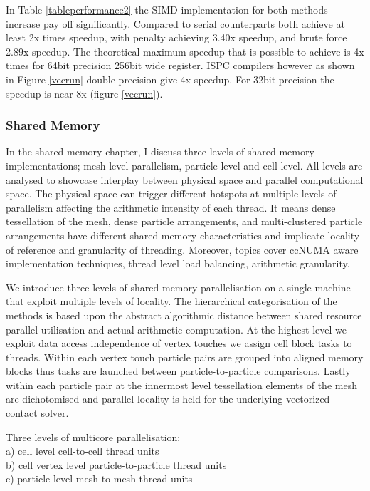 \documentclass[times,12pt]{article}
\begin{document}
In Table \ref{tableperformance2} the SIMD implementation for both methods increase pay off significantly. Compared to serial counterparts both achieve at least 2x times speedup, with penalty achieving  3.40x speedup, and brute force 2.89x speedup. The theoretical maximum speedup that is possible to achieve is 4x times for 64bit precision 256bit wide register. ISPC compilers however as shown in Figure \ref{vecrun} double precision give 4x speedup. For 32bit precision the speedup is near 8x (figure \ref{vecrun}).


\subsubsection{Shared Memory}

In the shared memory chapter, I discuss three levels of shared memory implementations; mesh level parallelism, particle level and cell level. All levels are analysed to showcase interplay between physical space and parallel computational space. The physical space can trigger different hotspots at multiple levels of parallelism affecting the arithmetic intensity of each thread. It means dense tessellation of the mesh, dense particle arrangements, and multi-clustered particle arrangements have different shared memory characteristics and implicate locality of reference and granularity of threading. Moreover, topics cover ccNUMA aware implementation techniques, thread level load balancing, arithmetic granularity.

We introduce three levels of shared memory parallelisation on a single machine that exploit multiple levels of locality. The hierarchical categorisation of the methods is based upon the abstract algorithmic distance between shared resource parallel utilisation and actual arithmetic computation. At the highest level we exploit  data access independence of vertex touches we assign cell block tasks to threads. Within each vertex touch particle pairs are grouped into aligned memory blocks thus tasks are launched between particle-to-particle comparisons. Lastly within each particle pair at the innermost level tessellation elements of the mesh are dichotomised and parallel locality is held for the underlying vectorized contact solver.

Three levels of multicore parallelisation:\\

a) cell level cell-to-cell thread units\\
b) cell vertex level particle-to-particle thread units\\
c) particle level mesh-to-mesh thread units\\
\end{document}
